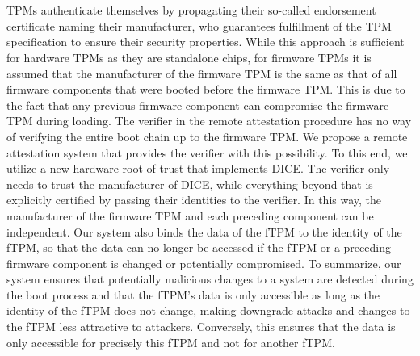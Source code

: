 \chapter{\abstractname}

TPMs authenticate themselves by propagating their so-called endorsement certificate naming their manufacturer, who guarantees fulfillment of the TPM specification to ensure their security properties.
While this approach is sufficient for hardware TPMs as they are standalone chips, for firmware TPMs it is assumed that the manufacturer of the firmware TPM is the same as that of all firmware components that were booted before the firmware TPM\@.
This is due to the fact that any previous firmware component can compromise the firmware TPM during loading.
The verifier in the remote attestation procedure has no way of verifying the entire boot chain up to the firmware TPM\@.
We propose a remote attestation system that provides the verifier with this possibility.
To this end, we utilize a new hardware root of trust that implements DICE\@.
The verifier only needs to trust the manufacturer of DICE, while everything beyond that is explicitly certified by passing their identities to the verifier.
In this way, the manufacturer of the firmware TPM and each preceding component can be independent.
Our system also binds the data of the fTPM to the identity of the fTPM, so that the data can no longer be accessed if the fTPM or a preceding firmware component is changed or potentially compromised.
To summarize, our system ensures that potentially malicious changes to a system are detected during the boot process and that the fTPM's data is only accessible as long as the identity of the fTPM does not change, making downgrade attacks and changes to the fTPM less attractive to attackers.
Conversely, this ensures that the data is only accessible for precisely this fTPM and not for another fTPM\@.
